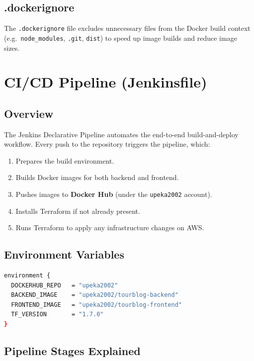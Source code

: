\documentclass[12pt,a4paper]{report}
\begin{document}
\section{.dockerignore}

The \texttt{.dockerignore} file excludes unnecessary files from the Docker build context (e.g.\ \texttt{node\_modules}, \texttt{.git}, \texttt{dist}) to speed up image builds and reduce image sizes.

\chapter{CI/CD Pipeline (Jenkinsfile)}

\section{Overview}

The Jenkins Declarative Pipeline automates the end-to-end build-and-deploy workflow. Every push to the repository triggers the pipeline, which:

\begin{enumerate}[leftmargin=2em]
  \item Prepares the build environment.
  \item Builds Docker images for both backend and frontend.
  \item Pushes images to \textbf{Docker Hub} (under the \texttt{upeka2002} account).
  \item Installs Terraform if not already present.
  \item Runs Terraform to apply any infrastructure changes on AWS.
\end{enumerate}

\section{Environment Variables}

\begin{lstlisting}[language=bash, caption={Jenkinsfile environment block}]
environment {
  DOCKERHUB_REPO   = "upeka2002"
  BACKEND_IMAGE    = "upeka2002/tourblog-backend"
  FRONTEND_IMAGE   = "upeka2002/tourblog-frontend"
  TF_VERSION       = "1.7.0"
}
\end{lstlisting}

\section{Pipeline Stages Explained}
\end{document}
